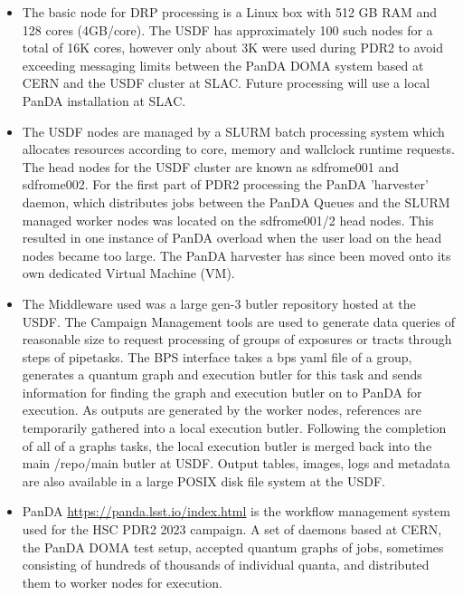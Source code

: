 \begin{itemize}

\item The basic node for DRP processing is a Linux box with 512 GB RAM and
128 cores (4GB/core).  The USDF has approximately 100 such nodes for
a total of 16K cores, however only about 3K were used during PDR2 to avoid
exceeding messaging limits between the PanDA DOMA system based at CERN 
and the USDF cluster at SLAC.  Future processing will use a local
PanDA installation at SLAC.  
		
\item The USDF nodes are managed by a SLURM batch
processing system which allocates resources according to core, memory and 
wallclock runtime requests.  The head nodes for the USDF cluster are 
known as sdfrome001 and sdfrome002.  For the first part of PDR2
processing the PanDA 'harvester' daemon, which distributes jobs between the
PanDA Queues and the SLURM managed worker nodes was located on the sdfrome001/2
head nodes.  This resulted in one instance of PanDA overload when the user load
on the head nodes became too large.  The PanDA harvester has since been
moved onto its own dedicated Virtual Machine (VM).

\item The Middleware used was a large gen-3 butler repository hosted
at the USDF.   The Campaign Management tools are used to 
generate data queries of reasonable size to 
request processing of groups of exposures or tracts
through steps of pipetasks.  The BPS interface
takes a bps yaml file of a group, generates a
quantum graph and execution butler for this
task and sends information for finding the graph
and execution butler on to PanDA for execution.
As outputs are generated by the worker nodes, references are 
temporarily gathered into a local execution butler.
Following the completion of all of a graphs tasks,
the local execution butler is merged back into
the main /repo/main butler at USDF.
Output tables, images, logs and metadata are 
also available in a large POSIX disk file system
at the USDF.

\item PanDA \url{https://panda.lsst.io/index.html} is the workflow 
management system used for the HSC PDR2 2023 campaign.
A set of daemons based at CERN, the PanDA DOMA test setup, accepted quantum
graphs of jobs,  sometimes consisting of hundreds of thousands of individual
quanta, and distributed them to worker nodes for execution.
\end{itemize}

